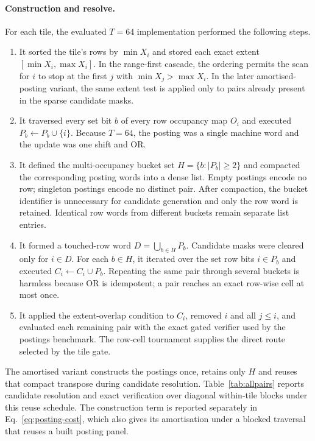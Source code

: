 \paragraph*{Construction and resolve.}
For each tile, the evaluated $T=64$ implementation performed the following steps.
\begin{enumerate}
\item It sorted the tile's rows by $\min X_i$ and stored each exact extent
$[\min X_i,\max X_i]$. In the range-first cascade, the ordering permits the scan for $i$ to stop at
the first $j$ with $\min X_j>\max X_i$. In the later amortised-posting variant, the same extent test
is applied only to pairs already present in the sparse candidate masks.
\item It traversed every set bit $b$ of every row occupancy map $O_i$ and executed
$P_b\leftarrow P_b\cup\{i\}$. Because $T=64$, the posting was a single machine word and the update was
one shift and OR.
\item It defined the multi-occupancy bucket set $H=\{b:|P_b|\ge2\}$ and compacted the corresponding
posting words into a dense list. Empty postings encode no row; singleton postings encode no distinct
pair. After compaction, the bucket identifier is unnecessary for candidate generation and only the
row word is retained. Identical row words from different buckets remain separate list entries.
\item It formed a touched-row word $D=\bigcup_{b\in H}P_b$. Candidate masks were cleared only for
$i\in D$. For each $b\in H$, it iterated over the set row bits $i\in P_b$ and executed
$C_i\leftarrow C_i\cup P_b$. Repeating the same pair through several buckets is harmless because OR is
idempotent; a pair reaches an exact row-wise cell at most once.
\item It applied the extent-overlap condition to $C_i$, removed $i$ and all $j\le i$, and evaluated
each remaining pair with the exact gated \cell{\rB}{\rS} verifier used by the postings benchmark.
The row-cell tournament supplies the direct route selected by the tile gate.
\end{enumerate}

The amortised variant constructs the postings once, retains only $H$ and reuses that compact
transpose during candidate resolution. Table~\ref{tab:allpairs} reports candidate resolution and
exact verification over diagonal within-tile blocks under this reuse schedule. The construction term
is reported separately in Eq.~\eqref{eq:posting-cost}, which also gives its amortisation under a
blocked traversal that reuses a built posting panel.

